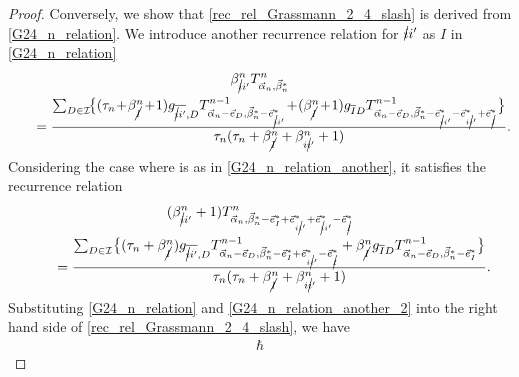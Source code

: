 \documentclass[pdftex]{sigma}
\numberwithin{equation}{section}
\begin{document}
\begin{proof}
Conversely, we show that \eqref{rec_rel_Grassmann_2_4_slash} is derived from \eqref{G24_n_relation}. We introduce another recurrence relation for $\cancel{i}i'$ as $I$ in \eqref{G24_n_relation}
\begin{gather}
 \beta_{\cancel{i}i'}^{n}
 T^{n}_{\vec{\alpha}_{n},\vec{\beta}_{n}^{\ast}}\nonumber
 \\
 \qquad=
 \frac{
 \sum_{
 D
 \in
 \mathcal{I}
 }\!
 \bigl\{
 (
 \tau_{n}\!
 +\!
 \beta_{\cancel{I}}^{n}\!
 +\!
 1
 )
 g_{\overline{\cancel{i}i'},D}
 T^{n-1}_{
 \vec{\alpha}_{n}
 -
 \vec{e}_{D},
 \vec{\beta}_{n}^{\ast}
 -
 \vec{e}_{\cancel{i}i'}^{\ast}
 }\!
 +\!
 (
 \beta_{\cancel{I}}^{n}\!
 +\!
 1
 )
 g_{\overline{I}D}
 T^{n-1}_{
 \vec{\alpha}_{n}
 -
 \vec{e}_{D},
 \vec{\beta}_{n}^{\ast}
 -
 \vec{e}_{\cancel{i}i'}^{\ast}
 -
 \vec{e}_{i\cancel{i}'}^{\ast}
 +
 \vec{e}_{\cancel{I}}^{\ast}
 }
 \bigr\}
 }{
 \tau_{n}
 (
 \tau_{n}
 +
 \beta_{\cancel{I}}^{n}
 +
 \beta_{i\cancel{i}'}^{n}
 +
 1
 )
 }
 .
\label{G24_n_relation_another}
\end{gather}
Considering the case where
is
as
in \eqref{G24_n_relation_another}, it satisfies the recurrence relation
\begin{gather}
 (
 \beta_{\cancel{i}i'}^{n}
 +
 1
 )
 T^{n}_{
 \vec{\alpha}_{n},
 \vec{\beta}_{n}^{\ast}
 -
 \vec{e}_{I}^{\ast}
 +
 \vec{e}_{i\cancel{i}'}^{\ast}
 +
 \vec{e}_{\cancel{i}i'}^{\ast}
 -
 \vec{e}_{\cancel{I}}^{\ast}
 }\nonumber\\
 \qquad
 =
 \frac{
 \sum_{
 D
 \in
 \mathcal{I}
 }
 \bigl\{
 (
 \tau_{n}
 +
 \beta_{\cancel{I}}^{n}
 )
 g_{\overline{\cancel{i}i'},D}
 T^{n-1}_{
 \vec{\alpha}_{n}
 -
 \vec{e}_{D},
 \vec{\beta}_{n}^{\ast}
 -
 \vec{e}_{I}^{\ast}
 +
 \vec{e}_{i\cancel{i}'}^{\ast}
 -
 \vec{e}_{\cancel{I}}^{\ast}
 }
 +
 \beta_{\cancel{I}}^{n}
 g_{\overline{I}D}
 T^{n-1}_{
 \vec{\alpha}_{n}
 -
 \vec{e}_{D},
 \vec{\beta}_{n}^{\ast}
 -
 \vec{e}_{I}^{\ast}
 }
 \bigr\}
 }{
 \tau_{n}
 (
 \tau_{n}
 +
 \beta_{\cancel{I}}^{n}
 +
 \beta_{i\cancel{i}'}^{n}
 +
 1
 )
 }
 .
\label{G24_n_relation_another_2}
\end{gather}
Substituting \eqref{G24_n_relation} and \eqref{G24_n_relation_another_2} into the right hand side of \eqref{rec_rel_Grassmann_2_4_slash}, we have
\begin{gather*}%
 \hbar

\end{gather*}
\end{proof}
\end{document}
